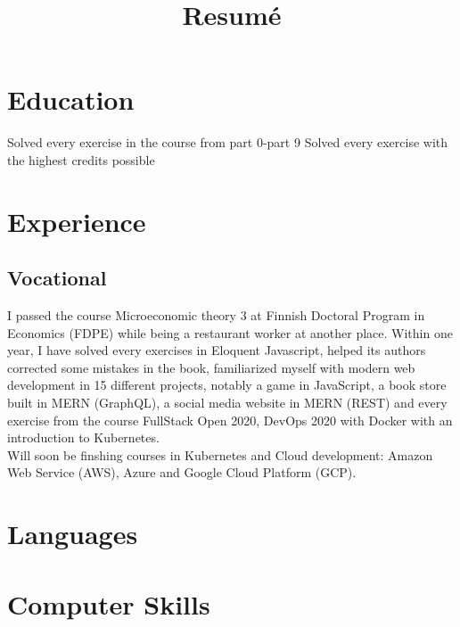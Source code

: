\documentclass[11pt,a4paper,sans]{moderncv}
\title{Resumé}
\begin{document}
  \makecvtitle

  \section{Education}
  {}
  {Solved every exercise in the course from part 0-part 9}
  {Solved every exercise with the highest credits possible}

  \section{Experience}
  \subsection{Vocational}
  {}
  {I passed the course Microeconomic theory 3 at Finnish Doctoral Program in Economics (FDPE)
  while being a restaurant worker at another place.}
  {Within one year, I have solved every exercises in Eloquent Javascript, helped its authors
  corrected some mistakes in the book, familiarized myself with modern web
  development in 15 different projects, notably a game in JavaScript,
  a book store built in MERN (GraphQL), a social media website in MERN (REST)
  and every exercise from the course FullStack Open 2020, DevOps 2020 with Docker
  with an introduction to Kubernetes.
  \\
  Will soon be finshing courses in Kubernetes and Cloud
  development: Amazon Web Service (AWS), Azure and Google Cloud Platform (GCP).}

  \section{Languages}

  \clearpage

  \section{Computer Skills}
\end{document}
